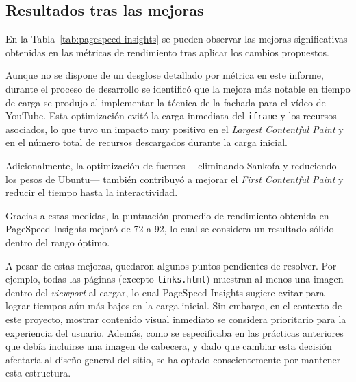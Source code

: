 \documentclass{article}
\begin{document}
\subsection{Resultados tras las mejoras}\label{subsec:resultados-tras-las-mejoras}

En la Tabla~\ref{tab:pagespeed-insights} se pueden observar las mejoras significativas obtenidas en las métricas de rendimiento tras aplicar los cambios propuestos.

Aunque no se dispone de un desglose detallado por métrica en este informe, durante el proceso de desarrollo se identificó que la mejora más notable en tiempo de carga se produjo al implementar la técnica de la fachada para el vídeo de YouTube. Esta optimización evitó la carga inmediata del \texttt{iframe} y los recursos asociados, lo que tuvo un impacto muy positivo en el \textit{Largest Contentful Paint} y en el número total de recursos descargados durante la carga inicial.

Adicionalmente, la optimización de fuentes —eliminando Sankofa y reduciendo los pesos de Ubuntu— también contribuyó a mejorar el \textit{First Contentful Paint} y reducir el tiempo hasta la interactividad.

Gracias a estas medidas, la puntuación promedio de rendimiento obtenida en PageSpeed Insights mejoró de 72 a 92, lo cual se considera un resultado sólido dentro del rango óptimo.

A pesar de estas mejoras, quedaron algunos puntos pendientes de resolver. Por ejemplo, todas las páginas (excepto \texttt{links.html}) muestran al menos una imagen dentro del \textit{viewport} al cargar, lo cual PageSpeed Insights sugiere evitar para lograr tiempos aún más bajos en la carga inicial. Sin embargo, en el contexto de este proyecto, mostrar contenido visual inmediato se considera prioritario para la experiencia del usuario. Además, como se especificaba en las prácticas anteriores que debía incluirse una imagen de cabecera, y dado que cambiar esta decisión afectaría al diseño general del sitio, se ha optado conscientemente por mantener esta estructura.
\end{document}
